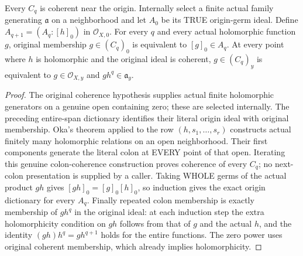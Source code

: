 \begin{lemma}
\label{hir:relative-normal-coherent-saturation-colon-dictionary}
\leanok
{}
Every $C_q$ is coherent near the origin. Internally select a finite
actual family generating $\mathfrak a$ on a neighborhood and let
$A_0$ be its TRUE origin-germ ideal. Define
$A_{q+1}=(A_q:[h]_0)$ in $\mathcal O_{X,0}$. For every $q$ and every
actual holomorphic function $g$, original membership
$g\in(C_q)_0$ is equivalent to $[g]_0\in A_q$.
At every point where $h$ is holomorphic and the original ideal is
coherent, $g\in(C_q)_y$ is equivalent to
$g\in\mathcal O_{X,y}$ and $g h^q\in\mathfrak a_y$.
\end{lemma}
\begin{proof}
The original coherence hypothesis supplies actual finite holomorphic
generators on a genuine open containing zero; these are selected
internally. The preceding entire-span dictionary identifies their
literal origin ideal with original membership. Oka's theorem applied
to the row $(h,s_1,\ldots,s_r)$ constructs actual finitely many
holomorphic relations on an open neighborhood. Their first
components generate the literal colon at EVERY point of that open.
Iterating this genuine colon-coherence construction proves coherence
of every $C_q$; no next-colon presentation is supplied by a caller.
Taking WHOLE germs of the actual product $gh$ gives
$[gh]_0=[g]_0[h]_0$, so induction gives the exact origin dictionary
for every $A_q$. Finally repeated colon membership is exactly
membership of $g h^q$ in the original ideal: at each induction step
the extra holomorphicity condition on $gh$ follows from that of
$g$ and the actual $h$, and the identity
$(gh)h^q=g h^{q+1}$ holds for the entire functions. The zero power
uses original coherent membership, which already implies
holomorphicity.
\end{proof}

